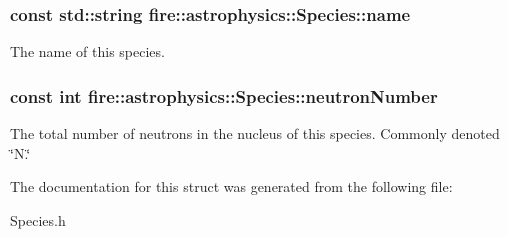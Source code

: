 \subsubsection[{\texorpdfstring{name}{name}}]{\setlength{\rightskip}{0pt plus 5cm}const std\+::string fire\+::astrophysics\+::\+Species\+::name}\hypertarget{a00282_a4aea10c6b155eaeeb52dedcef2dcf849}{}\label{a00282_a4aea10c6b155eaeeb52dedcef2dcf849}
The name of this species. 
\subsubsection[{\texorpdfstring{neutron\+Number}{neutronNumber}}]{\setlength{\rightskip}{0pt plus 5cm}const int fire\+::astrophysics\+::\+Species\+::neutron\+Number}\hypertarget{a00282_acd295953eb640a1354df0be96e63f1cd}{}\label{a00282_acd295953eb640a1354df0be96e63f1cd}
The total number of neutrons in the nucleus of this species. Commonly denoted \char`\"{}\+N.\char`\"{} 

The documentation for this struct was generated from the following file\+:\begin{DoxyCompactItemize}
\item 
Species.\+h\end{DoxyCompactItemize}
